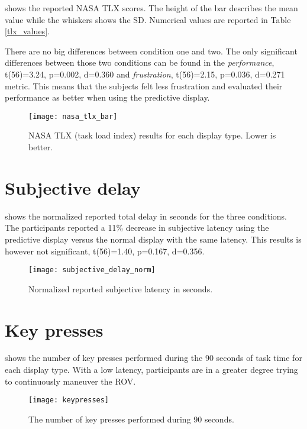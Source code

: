  shows the reported NASA TLX scores. The height of the bar describes the mean value while the whiskers shows the SD. Numerical values are reported in Table \ref{tlx_values}.

There are no big differences between condition one and two. The only significant differences between those two conditions can be found in the \emph{performance}, t(56)=3.24, p=0.002, d=0.360 and \emph{frustration}, t(56)=2.15, p=0.036, d=0.271 metric. This means that the subjects felt less frustration and evaluated their performance as better when using the predictive display.


\begin{figure}[h!]
    \centering
    \texttt{[image: nasa\_tlx\_bar]}
    \caption{NASA TLX (task load index) results for each display type. Lower is better.}
    \label{tlx}
\end{figure}


\clearpage
\section{Subjective delay}

 shows the normalized reported total delay in seconds for the three conditions. The participants reported a 11\% decrease in subjective latency using the predictive display versus the normal display with the same latency. This results is however not significant, t(56)=1.40, p=0.167, d=0.356.


\begin{figure}[h!]
    \centering
    \texttt{[image: subjective\_delay\_norm]}
    \caption{Normalized reported subjective latency in seconds.}
    \label{subjective_delay_norm}
\end{figure}

\section{Key presses}

 shows the number of key presses performed during the 90 seconds of task time for each display type. With a low latency, participants are in a greater degree trying to continuously maneuver the ROV.

\begin{figure}[h!]
    \centering
    \texttt{[image: keypresses]}
    \caption{The number of key presses performed during 90 seconds.}
    \label{keypresses}
\end{figure}

